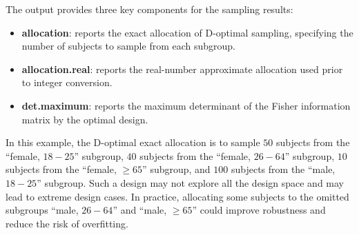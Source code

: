 
\noindent The output provides three key components for the sampling results:
\begin{itemize}
  \item \textbf{allocation}: reports the exact allocation of D-optimal sampling, specifying the number of subjects to sample from each subgroup.
  \item \textbf{allocation.real}: reports the real-number approximate allocation used prior to integer conversion.
  \item \textbf{det.maximum}: reports the maximum determinant of the Fisher information matrix by the optimal design.
\end{itemize}

In this example, the D-optimal exact allocation is to sample $50$ subjects from the ``female, $18-25$'' subgroup, $40$ subjects from the ``female, $26-64$'' subgroup, $10$ subjects from the ``female, $$'' subgroup, and $100$ subjects from the ``male, $18-25$'' subgroup. Such a design may not explore all the design space and may lead to extreme design cases. In practice, allocating some subjects to the omitted subgroups ``male, $26-64$'' and ``male, $$'' could improve robustness and reduce the risk of overfitting.


